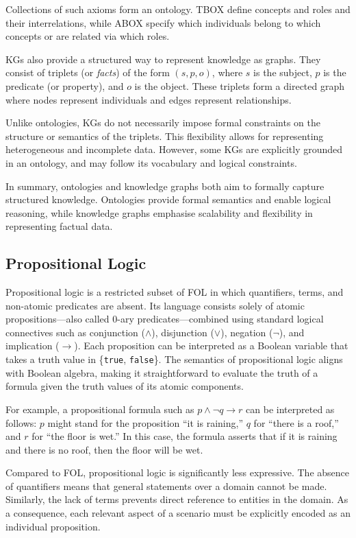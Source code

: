 Collections of such axioms form an ontology.
%
\Gls{TBOX} define concepts and roles and their interrelations, while \gls{ABOX} specify which individuals belong to which concepts or are related via which roles.

\Glspl{KG} also provide a structured way to represent knowledge as graphs.
%
They consist of triplets (or \emph{facts}) of the form $(s, p, o)$, where $s$ is the subject, $p$ is the predicate (or property), and $o$ is the object.
%
These triplets form a directed graph where nodes represent individuals and edges represent relationships.

Unlike ontologies, KGs do not necessarily impose formal constraints on the structure or semantics of the triplets.
%
This flexibility allows for representing heterogeneous and incomplete data.
%
However, some \glspl{KG} are explicitly grounded in an ontology, and may follow its vocabulary and logical constraints.

In summary, ontologies and knowledge graphs both aim to formally capture structured knowledge.
%
Ontologies provide formal semantics and enable logical reasoning, while knowledge graphs emphasise scalability and flexibility in representing factual data.


\subsection{Propositional Logic}\label{subsec:propositional-logic}
%
Propositional logic is a restricted subset of \gls{FOL} in which quantifiers, terms, and non-atomic predicates are absent.  
%
Its language consists solely of atomic propositions—also called 0-ary predicates—combined using standard logical connectives such as conjunction ($\land$), disjunction ($\lor$), negation ($\lnot$), and implication ($\rightarrow$).  
%
Each proposition can be interpreted as a Boolean variable that takes a truth value in \{\texttt{true}, \texttt{false}\}.  
%
The semantics of propositional logic aligns with Boolean algebra, making it straightforward to evaluate the truth of a formula given the truth values of its atomic components.

For example, a propositional formula such as $p \land \lnot q \rightarrow r$ can be interpreted as follows:  
%
$p$ might stand for the proposition ``it is raining,'' $q$ for ``there is a roof,'' and $r$ for ``the floor is wet.''  
%
In this case, the formula asserts that if it is raining and there is no roof, then the floor will be wet.

Compared to \gls{FOL}, propositional logic is significantly less expressive.  
%
The absence of quantifiers means that general statements over a domain cannot be made.  
%
Similarly, the lack of terms prevents direct reference to entities in the domain.  
%
As a consequence, each relevant aspect of a scenario must be explicitly encoded as an individual proposition.

